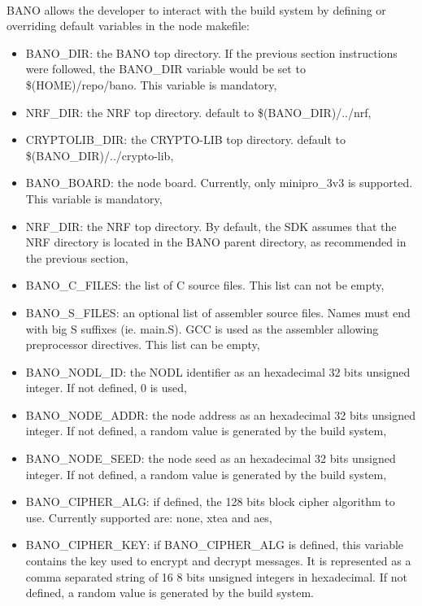 \documentclass[a4paper, 11pt]{article}
\begin{document}
\paragraph{}
BANO allows the developer to interact with the build system by
defining or overriding default variables in the node makefile:
\begin{itemize}
\item BANO\_DIR: the BANO top directory. If the previous section
instructions were followed, the BANO\_DIR variable would be set
to \$(HOME)/repo/bano. This variable is mandatory,
\item NRF\_DIR: the NRF top directory. default to
\$(BANO\_DIR)/../nrf,
\item CRYPTOLIB\_DIR: the CRYPTO-LIB top directory. default to
\$(BANO\_DIR)/../crypto-lib,
\item BANO\_BOARD: the node board. Currently, only minipro\_3v3
is supported. This variable is mandatory,
\item NRF\_DIR: the NRF top directory. By default, the SDK
assumes that the NRF directory is located in the BANO parent
directory, as recommended in the previous section,
\item BANO\_C\_FILES: the list of C source files. This list
can not be empty,
\item BANO\_S\_FILES: an optional list of assembler source files.
Names must end with big S suffixes (ie. main.S). GCC is used as
the assembler allowing preprocessor directives. This list can be
empty,
\item BANO\_NODL\_ID: the NODL identifier as an hexadecimal
32 bits unsigned integer. If not defined, 0 is used,
\item BANO\_NODE\_ADDR: the node address as an hexadecimal 32
bits unsigned integer. If not defined, a random value is
generated by the build system,
\item BANO\_NODE\_SEED: the node seed as an hexadecimal 32
bits unsigned integer. If not defined, a random value is
generated by the build system,
\item BANO\_CIPHER\_ALG: if defined, the 128 bits block cipher
algorithm to use. Currently supported are: none, xtea and aes,
\item BANO\_CIPHER\_KEY: if BANO\_CIPHER\_ALG is defined, this
variable contains the key used to encrypt and decrypt messages.
It is represented as a comma separated string of 16 8 bits
unsigned integers in hexadecimal. If not defined, a random value
is generated by the build system.
\end{itemize}
\end{document}

